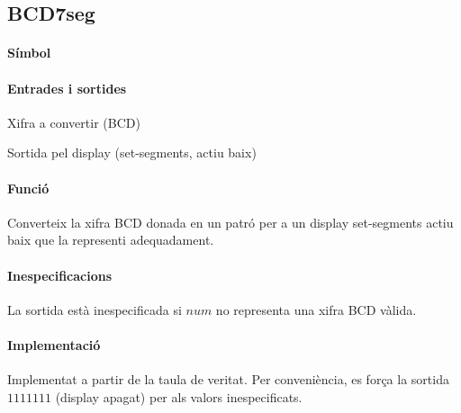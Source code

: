 \subsection{\label{sub:\projectname-BCD7seg} \textsf{BCD7seg}}

\paragraph{Símbol}
\begin{center}  \end{center}

\paragraph{Entrades i sortides}

\begin{where}
\item[\nodenamerange{num}{3}{0}] Xifra a convertir (BCD)
\item[\nodenamerange{HEX}{6}{0}] Sortida pel display (set-segments, actiu baix)
\end{where}

\paragraph{Funció}

Converteix la xifra BCD donada en un patró per a un display set-segments actiu baix
que la representi adequadament.

\paragraph{Inespecificacions}


La sortida està inespecificada si $num$ no representa una xifra BCD vàlida.


\paragraph{Implementació}




Implementat a partir de la taula de veritat. Per conveniència, es força la sortida
$1111111$ (display apagat) per als valors inespecificats.

\vspace{1cm}
